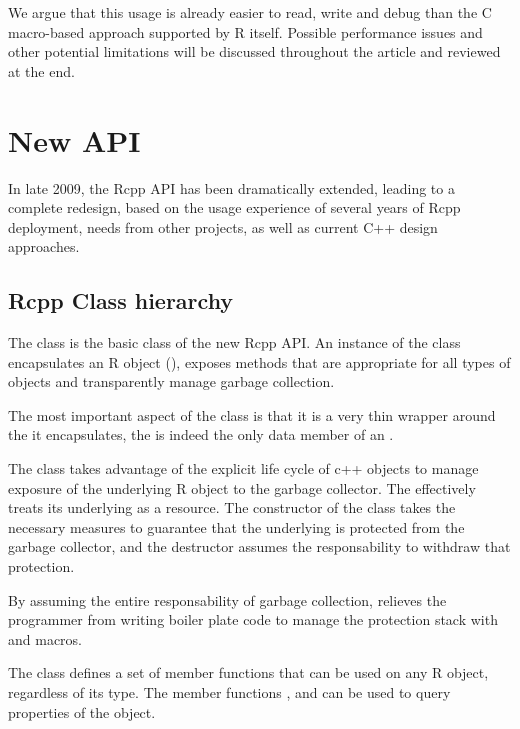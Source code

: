 We argue that this usage is already easier to read, write and debug than the
C macro-based approach supported by R itself. Possible performance issues and
other potential limitations will be discussed throughout the article and
reviewed at the end.

\section{New  API}
\label{sec:new_rcpp}

In late 2009, the Rcpp API has been dramatically extended, leading to a 
complete redesign, based on the usage experience of several 
years of Rcpp deployment, needs from other projects, 
as well as current C++ design approaches.

\subsection{Rcpp Class hierarchy}

The  class is the basic class of the new Rcpp API. 
An instance of the  class encapsulates an R object
(), exposes methods that are appropriate for all types 
of objects and transparently manage garbage collection.

The most important aspect of the  class is that it is 
a very thin wrapper around the  it encapsulates, the 
 is indeed the only data member of an .

The  class takes advantage of the explicit life cycle of 
c++ objects to manage exposure of the underlying R object to the 
garbage collector. The  effectively treats 
its underlying  as a resource.
The constructor of the  class takes 
the necessary measures to guarantee that the underlying 
is protected from the garbage collector, and the destructor
assumes the responsability to withdraw that protection. 

By assuming the entire responsability of garbage collection, 
relieves the programmer from writing boiler plate code to manage
the protection stack with  and  macros.

The  class defines a set of member functions that
can be used on any R object, regardless of its type. The member
functions ,  and  can be 
used to query properties of the object. 

